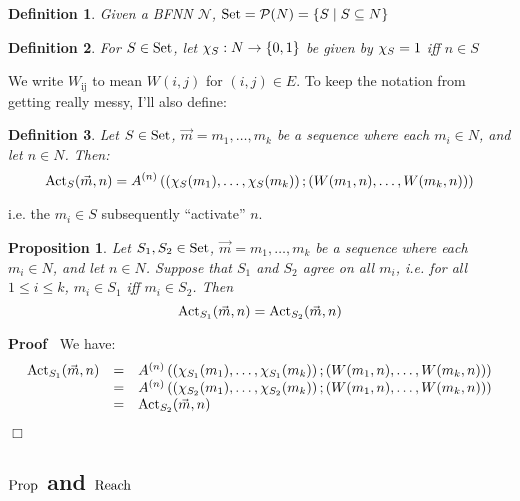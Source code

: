 \documentclass{article}
\newcommand{\tmop}[1]{\ensuremath{\operatorname{#1}}}
\newenvironment{proof}{\noindent\textbf{Proof\ }}{\hspace*{\fill}$\Box$\medskip}
\newtheorem{definition}{Definition}
\newtheorem{proposition}{Proposition}
\newcommand{\Net}{\ensuremath{\mathcal{N}}}
\newcommand{\Set}{\textsf{\tmop{Set}}}
\newcommand{\bigchi}{\Large{\chi}}
\newcommand{\powerset}{\mathcal{P}}
\newcommand{\Reach}{\textsf{\tmop{Reach}}}
\newcommand{\Prop}{\textsf{\tmop{Prop}}}
\newcommand{\Activ}{\textsf{\tmop{Act}}}
\begin{document}
\begin{definition}
  Given a BFNN {\Net}, $\Set = \powerset (N) = \{ S \mid S \subseteq N \}$
\end{definition}

\begin{definition}
  For $S \in \Set$, let $\bigchi_S : N \rightarrow \{ 0, 1 \}$ be given by
  $\bigchi_S = 1$ iff $n \in S$
\end{definition}

We write $W_{\tmop{ij}}$ to mean $W (i, j)$ for $(i, j) \in E$. To keep the
notation from getting really messy, I'll also define:

\begin{definition}
  Let $S \in \Set$, $\vec{m} = m_1, \ldots, m_k$ be a sequence where each $m_i
  \in N$, and let $n \in N$. Then:
  \[ \Activ_S (\vec{m}, n) = A^{(n)} \left( \left( \bigchi_S (m_1), \ldots,
     \bigchi_S (m_k) \right) ; (W (m_1, n), \ldots, W (m_k, n)) \right) \]
\end{definition}

i.e. the $m_i \in S$ subsequently ``activate'' $n$.

\begin{proposition}
  \label{activation-agrees}Let $S_1, S_2 \in \Set$, $\vec{m} = m_1, \ldots,
  m_k$ be a sequence where each $m_i \in N$, and let $n \in N$. Suppose that
  $S_1$ and $S_2$ agree on all $m_i$, i.e. for all $1 \leq i \leq k$, $m_i \in
  S_1$ iff $m_i \in S_2$. Then
  \[ \Activ_{S_1} (\vec{m}, n) = \Activ_{S_2} (\vec{m}, n) \]
\end{proposition}

\begin{proof}
  We have:
  \[ \begin{array}{lll}
       \Activ_{S_1} (\vec{m}, n) & = & A^{(n)} \left( \left( \bigchi_{S_1}
       (m_1), \ldots, \bigchi_{S_1} (m_k) \right) ; (W (m_1, n), \ldots, W
       (m_k, n)) \right)\\
       & = & A^{(n)} \left( \left( \bigchi_{S_2} (m_1), \ldots, \bigchi_{S_2}
       (m_k) \right) ; (W (m_1, n), \ldots, W (m_k, n)) \right)\\
       & = & \Activ_{S_2} (\vec{m}, n)
     \end{array} \]
  
\end{proof}

\subsection{$\Prop$ and $\Reach$}
\end{document}
